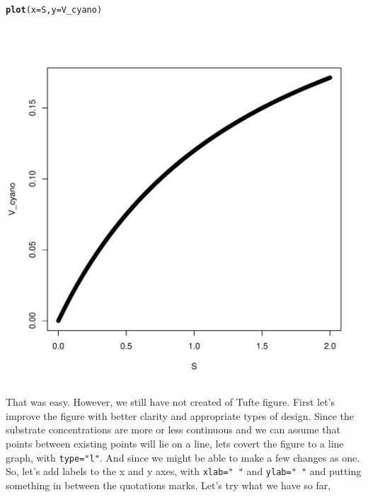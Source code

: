 \documentclass{tufte-handout}\usepackage[]{graphicx}\usepackage[]{xcolor}
\makeatletter
\def\maxwidth{ %
  \ifdim\Gin@nat@width>\linewidth
    \linewidth
  \else
    \Gin@nat@width
  \fi
}
\newcommand{\hlstd}[1]{\textcolor[rgb]{0.345,0.345,0.345}{#1}}%
\newcommand{\hlkwc}[1]{\textcolor[rgb]{0.333,0.667,0.333}{#1}}%
\newcommand{\hlkwd}[1]{\textcolor[rgb]{0.737,0.353,0.396}{\textbf{#1}}}%
\newenvironment{kframe}{%
 \def\at@end@of@kframe{}%
 \ifinner\ifhmode%
  \def\at@end@of@kframe{\end{minipage}}%
  \begin{minipage}{\columnwidth}%
 \fi\fi%
 \def\FrameCommand##1{\hskip\@totalleftmargin \hskip-\fboxsep
 \colorbox{shadecolor}{##1}\hskip-\fboxsep
     \hskip-\linewidth \hskip-\@totalleftmargin \hskip\columnwidth}%
 \MakeFramed {\advance\hsize-\width
   \@totalleftmargin\z@ \linewidth\hsize
   \@setminipage}}%
 {\par\unskip\endMakeFramed%
 \at@end@of@kframe}
\newenvironment{knitrout}{}{} %
\makeatother
\begin{document}
\begin{knitrout}
\color{fgcolor}\begin{kframe}
\begin{alltt}
\hlkwd{plot}\hlstd{(}\hlkwc{x}\hlstd{=S,} \hlkwc{y}\hlstd{=V_cyano)}
\end{alltt}
\end{kframe}
\includegraphics[width=\maxwidth]{figure/unnamed-chunk-59-1} 
\end{knitrout}

That was easy. However, we still have not created of Tufte figure. First let's improve the figure with better clarity and appropriate types of design. Since the substrate concentrations are more or less continuous and we can assume that points between existing points will lie on a line, lets covert the figure to a line graph, with \texttt{type="l"}. And since we might be able to make a few changes as one.  So, let's add labels to the x and y axes, with \texttt{xlab=" "} and \texttt{ylab=" "} and putting something in between the quotations marks.  Let's try what we have so far,
\end{document}
